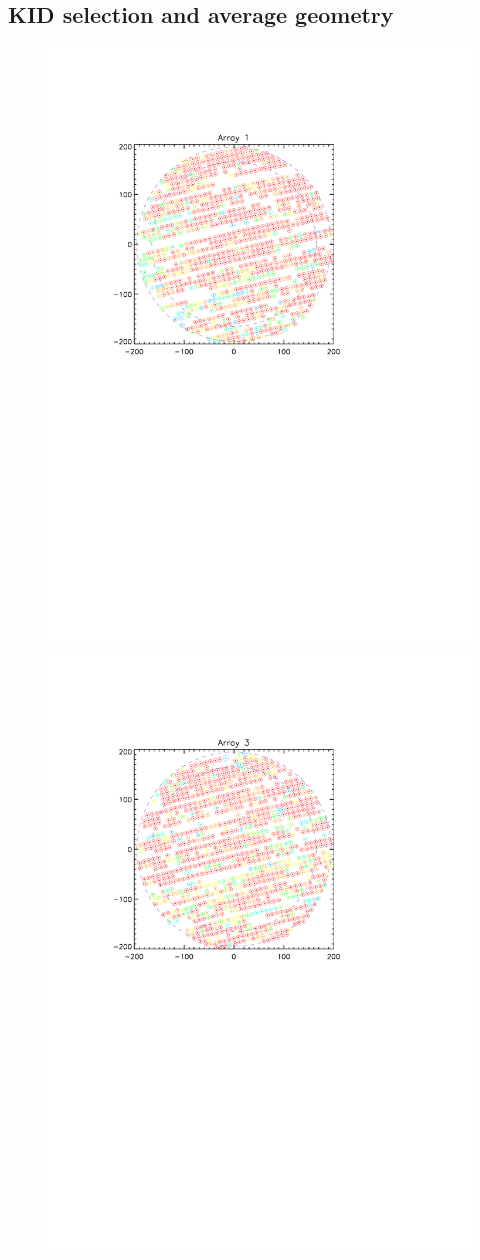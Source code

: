 \subsection{KID selection and average geometry}
\label{avg_kidpar}


\begin{figure}[p]
\begin{center}
\includegraphics[trim=2cm 14cm 4cm 4cm, clip=true,width=0.55\linewidth]{Figures/A1_fwhm_color_count.pdf}
\includegraphics[trim=2cm 14cm 4cm 4cm, clip=true,width=0.55\linewidth]{Figures/A3_fwhm_color_count.pdf}

\end{center}
\end{figure}
